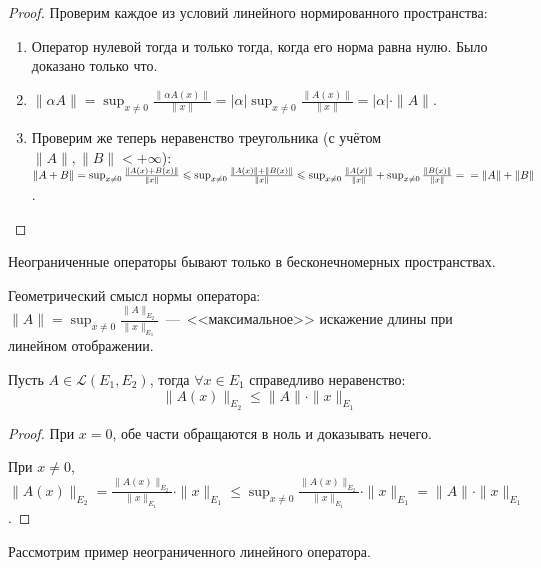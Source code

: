 \begin{proof}
    Проверим каждое из условий линейного нормированного пространства:   
    \begin{enumerate} 
        \item Оператор нулевой тогда и только тогда, когда его норма равна нулю. Было доказано только что.
        \item $\| \alpha A \| = \sup_{x \neq 0}{\frac{\|\alpha A(x)\|}{\|x\|}} = |\alpha| \sup_{x \neq 0}{\frac{\|A(x)\|}{\|x\|}} = |\alpha| \cdot \|A\|$.
        \item Проверим же теперь неравенство треугольника (с учётом $\| A\|, \| B\| < +\infty$):\\
        $\| A + B \| = \sup_{x \neq 0}{\frac{\| A(x) + B(x) \|}{\|x\|}} \leq \sup_{x \neq 0}{\frac{\|A(x)\| + \|B(x)\|}{\|x\|}} \leq \sup_{x \neq 0}{\frac{\|A(x)\|}{\|x\|}} + \sup_{x \neq 0}{\frac{\|B(x)\|}{\|x\|}} = \\ = \|A\| + \|B\|$.
    \end{enumerate}
\end{proof}

\begin{note}
    Неограниченные операторы бывают только в бесконечномерных пространствах.
\end{note}

\begin{note}
    Геометрический смысл нормы оператора: \\
    $\|A\| = \sup_{x \neq 0}{\frac{\|A\|_{E_2}}{\|x\|_{E_1}}}$~---~<<максимальное>> искажение длины при линейном отображении.
\end{note}

\begin{lemma}
    Пусть $A \in \mathcal{L}(E_1, E_2)$, тогда $\forall x \in E_1$ справедливо неравенство:
    \[\|A(x)\|_{E_2} \leq \|A\| \cdot \|x\|_{E_1}\]
\end{lemma}

\begin{proof}
    При $x = 0$, обе части обращаются в ноль и доказывать нечего.

    При $x \neq 0$, $\|A(x)\|_{E_2} = \frac{\|A(x)\|_{E_2}}{\|x\|_{E_1}} \cdot \|x\|_{E_1} \leq \sup_{x \neq 0}{\frac{\|A(x)\|_{E_2}}{\|x\|_{E_1}}} \cdot \|x\|_{E_1} = \|A\| \cdot \|x\|_{E_1} $.
\end{proof}

Рассмотрим пример неограниченного линейного оператора.

